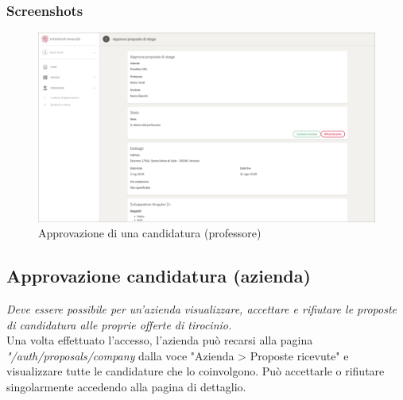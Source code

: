 \subsubsection{Screenshots}
\begin{figure}[H]
	\centering
	\includegraphics[width=1\textwidth]{Figs/screenshots/internshipproposalapprove}     
	\caption[Screenshot: approvazione di una candidatura (professore)]{Approvazione di una candidatura (professore)}
	\label{fig:screenshot:5}
\end{figure}

\pagebreak
\subsection{Approvazione candidatura (azienda)}

\textit{Deve essere possibile per un'azienda visualizzare, accettare e rifiutare le proposte di candidatura alle proprie offerte di tirocinio.} \\

\noindent
Una volta effettuato l'accesso, l'azienda può recarsi alla pagina \textit{"/auth/proposals/company} dalla voce "Azienda > Proposte ricevute" e visualizzare tutte le candidature che lo coinvolgono. Può accettarle o rifiutare singolarmente accedendo alla pagina di dettaglio.

